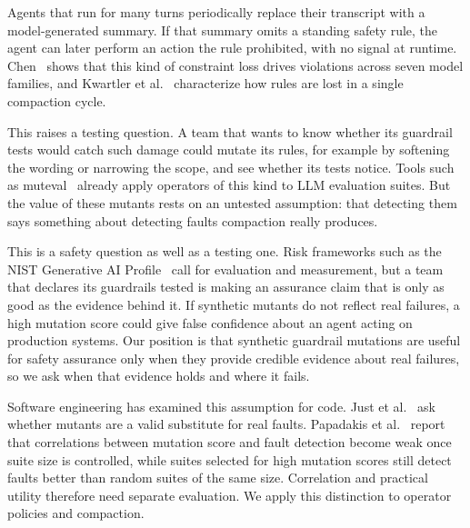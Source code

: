 \documentclass[manuscript,screen,nonacm]{acmart}
\begin{document}
Agents that run for many turns periodically replace their transcript with a model-generated summary. If that summary omits a standing safety rule, the agent can later perform an action the rule prohibited, with no signal at runtime. Chen~\cite{chen2026} shows that this kind of constraint loss drives violations across seven model families, and Kwartler et al.~\cite{kwartler2026} characterize how rules are lost in a single compaction cycle.

This raises a testing question. A team that wants to know whether its guardrail tests would catch such damage could mutate its rules, for example by softening the wording or narrowing the scope, and see whether its tests notice. Tools such as muteval~\cite{muteval} already apply operators of this kind to LLM evaluation suites. But the value of these mutants rests on an untested assumption: that detecting them says something about detecting faults compaction really produces.

This is a safety question as well as a testing one. Risk frameworks such as the NIST Generative AI Profile~\cite{nist2024} call for evaluation and measurement, but a team that declares its guardrails tested is making an assurance claim that is only as good as the evidence behind it. If synthetic mutants do not reflect real failures, a high mutation score could give false confidence about an agent acting on production systems. Our position is that synthetic guardrail mutations are useful for safety assurance only when they provide credible evidence about real failures, so we ask when that evidence holds and where it fails.

Software engineering has examined this assumption for code. Just et al.~\cite{just2014} ask whether mutants are a valid substitute for real faults. Papadakis et al.~\cite{papadakis2018} report that correlations between mutation score and fault detection become weak once suite size is controlled, while suites selected for high mutation scores still detect faults better than random suites of the same size. Correlation and practical utility therefore need separate evaluation. We apply this distinction to operator policies and compaction.
\end{document}
